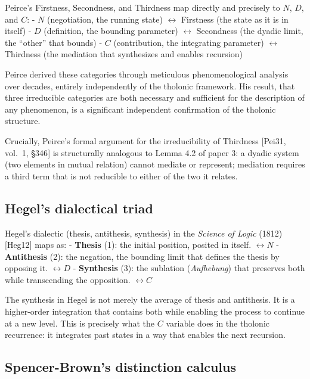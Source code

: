 \documentclass[12pt]{article}
\begin{document}
Peirce's Firstness, Secondness, and Thirdness map directly and precisely
to \(N\), \(D\), and \(C\): - \(N\) (negotiation, the running state)
\(\leftrightarrow\) Firstness (the state as it is in itself) - \(D\)
(definition, the bounding parameter) \(\leftrightarrow\) Secondness (the
dyadic limit, the ``other'' that bounds) - \(C\) (contribution, the
integrating parameter) \(\leftrightarrow\) Thirdness (the mediation that
synthesizes and enables recursion)

Peirce derived these categories through meticulous phenomenological
analysis over decades, entirely independently of the tholonic framework.
His result, that three irreducible categories are both necessary and
sufficient for the description of any phenomenon, is a significant
independent confirmation of the tholonic structure.

Crucially, Peirce's formal argument for the irreducibility of Thirdness
{[}Pei31, vol.~1, §346{]} is structurally analogous to Lemma 4.2 of
paper 3: a dyadic system (two elements in mutual relation) cannot
mediate or represent; mediation requires a third term that is not
reducible to either of the two it relates.

\subsection{Hegel's dialectical triad}\label{hegels-dialectical-triad}

Hegel's dialectic (thesis, antithesis, synthesis) in the \emph{Science
of Logic} (1812) {[}Heg12{]} maps as: - \textbf{Thesis} (1): the initial
position, posited in itself. \(\leftrightarrow N\) - \textbf{Antithesis}
(2): the negation, the bounding limit that defines the thesis by
opposing it. \(\leftrightarrow D\) - \textbf{Synthesis} (3): the
sublation (\emph{Aufhebung}) that preserves both while transcending the
opposition. \(\leftrightarrow C\)

The synthesis in Hegel is not merely the average of thesis and
antithesis. It is a higher-order integration that contains both while
enabling the process to continue at a new level. This is precisely what
the \(C\) variable does in the tholonic recurrence: it integrates past
states in a way that enables the next recursion.

\subsection{Spencer-Brown's distinction calculus}\label{spencer-browns-distinction-calculus}
\end{document}
